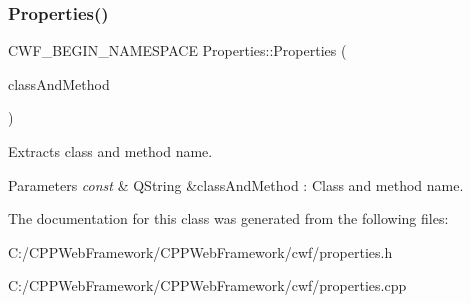 \subsubsection{\texorpdfstring{Properties()}{Properties()}}
{\footnotesize\ttfamily C\+W\+F\+\_\+\+B\+E\+G\+I\+N\+\_\+\+N\+A\+M\+E\+S\+P\+A\+CE Properties\+::\+Properties (\begin{DoxyParamCaption}\item[{const Q\+String \&}]{class\+And\+Method }\end{DoxyParamCaption})\hspace{0.3cm}{\ttfamily [explicit]}}



Extracts class and method name. 


\begin{DoxyParams}{Parameters}
{\em const} & Q\+String \&class\+And\+Method \+: Class and method name. \\
\hline
\end{DoxyParams}


The documentation for this class was generated from the following files\+:\begin{DoxyCompactItemize}
\item 
C\+:/\+C\+P\+P\+Web\+Framework/\+C\+P\+P\+Web\+Framework/cwf/properties.\+h\item 
C\+:/\+C\+P\+P\+Web\+Framework/\+C\+P\+P\+Web\+Framework/cwf/properties.\+cpp\end{DoxyCompactItemize}
